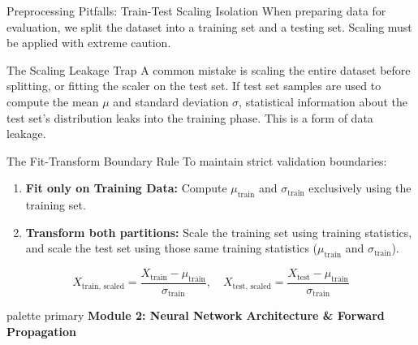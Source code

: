 \documentclass[9pt]{beamer}
\begin{document}
\begin{frame}{Preprocessing Pitfalls: Train-Test Scaling Isolation}
  When preparing data for evaluation, we split the dataset into a training set and a testing set. Scaling must be applied with extreme caution.
  \begin{alertblock}{The Scaling Leakage Trap}
    A common mistake is scaling the entire dataset before splitting, or fitting the scaler on the test set. 
    If test set samples are used to compute the mean $\mu$ and standard deviation $\sigma$, statistical information about the test set's distribution leaks into the training phase. This is a form of data leakage.
  \end{alertblock}
  \begin{block}{The Fit-Transform Boundary Rule}
    To maintain strict validation boundaries:
    \begin{enumerate}
      \item \textbf{Fit only on Training Data:} Compute $\mu_{\text{train}}$ and $\sigma_{\text{train}}$ exclusively using the training set.
      \item \textbf{Transform both partitions:} Scale the training set using training statistics, and scale the test set using those same training statistics ($\mu_{\text{train}}$ and $\sigma_{\text{train}}$).
    \end{enumerate}
    $$X_{\text{train, scaled}} = \frac{X_{\text{train}} - \mu_{\text{train}}}{\sigma_{\text{train}}}, \quad X_{\text{test, scaled}} = \frac{X_{\text{test}} - \mu_{\text{train}}}{\sigma_{\text{train}}}$$
  \end{block}
\end{frame}

\begin{frame}[plain]
  \vfill
  \centering
  \begin{beamercolorbox}[sep=8pt,center,shadow=true,rounded=true]{palette primary}
    \textbf{Module 2: Neural Network Architecture \& Forward Propagation}
  \end{beamercolorbox}
  \vfill
\end{frame}
\end{document}

